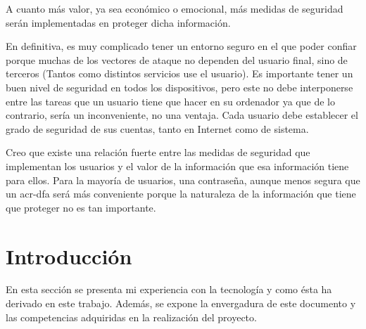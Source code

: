 \documentclass[titlepage, 12pt, a4paper]{article}
\begin{document}
A cuanto más valor, ya sea económico o emocional, más medidas de seguridad serán implementadas en proteger dicha información.\par En definitiva, es muy complicado tener un entorno seguro en el que poder confiar porque muchas de los vectores de ataque no dependen del usuario final, sino de terceros (Tantos como distintos servicios use el usuario). Es importante tener un buen nivel de seguridad en todos los dispositivos, pero este no debe interponerse entre las tareas que un usuario tiene que hacer en su ordenador ya que de lo contrario, sería un inconveniente, no una ventaja. Cada usuario debe establecer el grado de seguridad de sus cuentas, tanto en Internet como de sistema.\par Creo que existe una relación fuerte entre las medidas de seguridad que implementan los usuarios y el valor de la información que esa información tiene para ellos. Para la mayoría de usuarios, una contraseña, aunque menos segura que un \gls{acr-dfa} será más conveniente porque la naturaleza de la información que tiene que proteger no es tan importante.
\clearpage
\section{Introducción}
En esta sección se presenta mi experiencia con la tecnología y como ésta ha derivado en este trabajo. Además, se expone la envergadura de este documento y las competencias adquiridas en la realización del proyecto.
\end{document}
